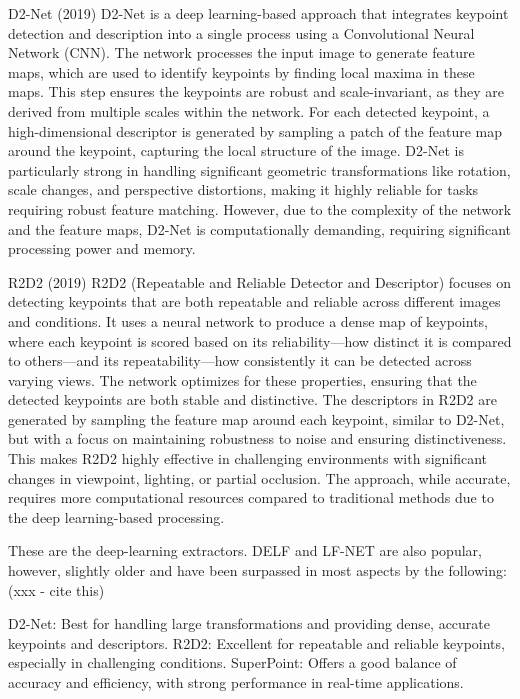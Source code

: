 D2-Net (2019)
D2-Net is a deep learning-based approach that integrates keypoint detection and description into a single process using a Convolutional Neural Network (CNN). The network processes the input image to generate feature maps, which are used to identify keypoints by finding local maxima in these maps. This step ensures the keypoints are robust and scale-invariant, as they are derived from multiple scales within the network. For each detected keypoint, a high-dimensional descriptor is generated by sampling a patch of the feature map around the keypoint, capturing the local structure of the image. D2-Net is particularly strong in handling significant geometric transformations like rotation, scale changes, and perspective distortions, making it highly reliable for tasks requiring robust feature matching. However, due to the complexity of the network and the feature maps, D2-Net is computationally demanding, requiring significant processing power and memory.

R2D2 (2019)
R2D2 (Repeatable and Reliable Detector and Descriptor) focuses on detecting keypoints that are both repeatable and reliable across different images and conditions. It uses a neural network to produce a dense map of keypoints, where each keypoint is scored based on its reliability—how distinct it is compared to others—and its repeatability—how consistently it can be detected across varying views. The network optimizes for these properties, ensuring that the detected keypoints are both stable and distinctive. The descriptors in R2D2 are generated by sampling the feature map around each keypoint, similar to D2-Net, but with a focus on maintaining robustness to noise and ensuring distinctiveness. This makes R2D2 highly effective in challenging environments with significant changes in viewpoint, lighting, or partial occlusion. The approach, while accurate, requires more computational resources compared to traditional methods due to the deep learning-based processing.




These are the deep-learning extractors. DELF and LF-NET are also popular, however, slightly older and have been surpassed in most aspects by the following: (xxx - cite this)

D2-Net: Best for handling large transformations and providing dense, accurate keypoints and descriptors.
R2D2: Excellent for repeatable and reliable keypoints, especially in challenging conditions.
SuperPoint: Offers a good balance of accuracy and efficiency, with strong performance in real-time applications.




